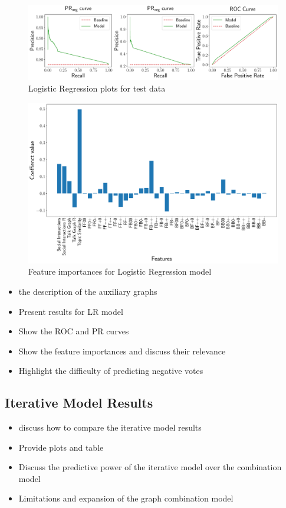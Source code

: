 \begin{figure}[htp]
    \centering
    \includegraphics[width=\textwidth]{images/Logisitc Regression_test.pdf}
    \caption{Logistic Regression plots for test data}
    \label{fig:lr-test-plots}
\end{figure}



\begin{figure}[htp]
    \centering
    \includegraphics[width=\textwidth]{images/Logistic Regression_features.pdf}
    \caption{Feature importances for Logistic Regression model }
    \label{fig:lr-feature-importances}
\end{figure}
\begin{itemize}
    \item the description of the auxiliary graphs 
    \item Present results for LR model
    \item Show the ROC and PR curves
    \item Show the feature importances and discuss their relevance 
    \item Highlight the difficulty of predicting negative votes
\end{itemize}

\subsection{Iterative Model Results}
\begin{itemize}
    \item discuss how to compare the iterative model results
    \item Provide plots and table 
    \item Discuss the predictive power of the iterative model over the combination model
    \item Limitations and expansion of the graph combination model
\end{itemize}

